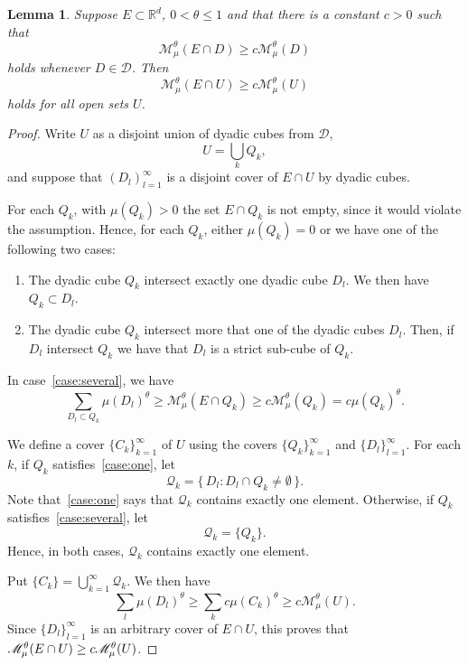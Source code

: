 \documentclass[11pt]{article}
\newtheorem{lemm}[theo]{Lemma}
\theoremstyle{definition}
\numberwithin{equation}{section}
\numberwithin{figure}{section}
\numberwithin{table}{section}
\begin{document}
\begin{lemm}\label{lem:open}
Suppose $E \subset \mathbb{R}^d$, $0 < \theta \leq 1$ and that there is a constant $c > 0$ such that
\[
\mathscr{M}_\mu^\theta (E \cap D) \geq c \mathscr{M}_\mu^\theta (D)
\]
holds whenever $D \in \mathscr{D}$. Then
\[
\mathscr{M}_\mu^\theta (E \cap U) \geq c \mathscr{M}_\mu^\theta (U)
\]
holds for all open sets $U$.
\end{lemm}

\begin{proof}
Write $U$ as a disjoint union of dyadic cubes from $\mathscr{D}$,
\[
U = \bigcup_k Q_k,
\]
and suppose that $(D_l)_{l=1}^\infty$ is a disjoint cover of $E \cap U$ by dyadic cubes.

For each $Q_k$, with $\mu (Q_k) > 0$ the set $E \cap Q_k$ is not empty, since it would violate the assumption. Hence, for each $Q_k$, either $\mu (Q_k) = 0$ or we have one of the following two cases:
\begin{enumerate}
\item \label{case:one}
The dyadic cube $Q_k$ intersect exactly one dyadic cube $D_l$. We then have $Q_k \subset D_l$.
\item \label{case:several}
The dyadic cube $Q_k$ intersect more that one of the dyadic cubes $D_l$. Then, if $D_l$ intersect $Q_k$ we have that $D_l$ is a strict sub-cube of $Q_k$.
\end{enumerate}
In case~\eqref{case:several}, we have
\[
\sum_{D_l \subset Q_k} \mu (D_l)^\theta \geq \mathscr{M}_\mu^\theta (E \cap Q_k) \geq c \mathscr{M}_\mu^\theta (Q_k) = c \mu (Q_k)^\theta.
\]

We define a cover $\{C_k\}_{k=1}^\infty$ of $U$ using the covers $\{Q_k\}_{k=1}^\infty$ and $\{D_l\}_{l=1}^\infty$. For each $k$, if $Q_k$ satisfies~\eqref{case:one}, let
\[
\mathscr{Q}_k = \{\, D_l : D_l \cap Q_k \neq \emptyset \,\}.
\]
Note that~\eqref{case:one} says that $\mathscr{Q}_k$ contains exactly one element. Otherwise, if $Q_k$ satisfies~\eqref{case:several}, let
\[
\mathscr{Q}_k = \{Q_k\}.
\]
Hence, in both cases, $\mathscr{Q}_k$ contains exactly one element.

Put $\{C_k\} = \bigcup_{k=1}^\infty \mathscr{Q}_k$. We then have
\[
\sum_l \mu (D_l)^\theta \geq \sum_k c \mu (C_k)^\theta \geq c \mathscr{M}_\mu^\theta (U).
\]
Since $\{D_l\}_{l=1}^\infty$ is an arbitrary cover of $E \cap U$, this proves that $\mathscr{M}_\mu^\theta (E \cap U) \geq\linebreak c \mathscr{M}_\mu^\theta (U)$.
\end{proof}
\end{document}

